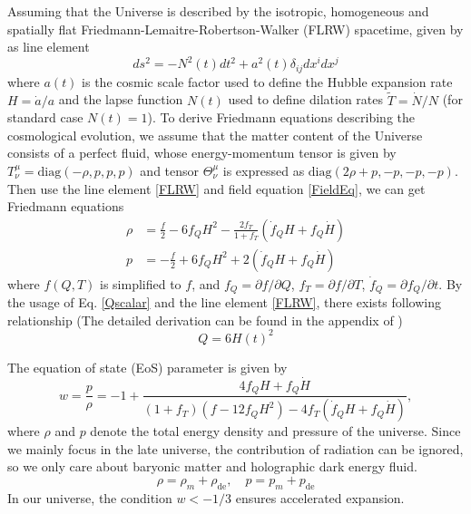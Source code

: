 \documentclass[preprint]{aastex631}
\begin{document}
Assuming that the Universe is described by the isotropic, homogeneous and spatially flat Friedmann-Lemaitre-Robertson-Walker (FLRW) spacetime, given by as line element
\begin{equation}
ds^2=-N^2(t)dt^2+a^2(t)\delta_{ij} dx^i dx^j\label{FLRW}
\end{equation}
where $a(t)$ is the cosmic scale factor
used to define the Hubble expansion rate $H=\dot{a}/a$ and the lapse function $N(t)$ used to define dilation rates $\tilde{T}=\dot{N}/N$ (for standard case $N(t)=1$). To derive Friedmann equations describing the cosmological evolution, we assume that the matter content of the Universe consists of a perfect fluid, whose  energy-momentum tensor is given by $T^{\mu}_\nu=\text{diag}(-\rho,p,p,p)$ and tensor $\Theta^{\mu}_\nu$ is expressed as $\text{diag}(2\rho+p,-p,-p,-p)$. Then use the line element \eqref{FLRW} and field equation \eqref{FieldEq}, we can get Friedmann equations
\begin{align}
\rho &=\frac{f}{2}-6f_Q H^2-\frac{2f_T}{1+f_T}(\dot{f}_QH+f_Q \dot{H}) \\
p &=-\frac{f}{2}+6f_Q H^2+2(\dot{f}_QH+f_Q \dot{H})
\end{align}
where $f(Q,T)$ is simplified to $f$, and $f_Q=\partial f/\partial Q$, $f_T=\partial f/\partial T$, $\dot{f}_Q=\partial f_Q/\partial t$. By the usage of Eq. \eqref{Qscalar} and the line element \eqref{FLRW}, there exists following relationship (The detailed derivation can be found in the appendix of \cite{Xu_2019})
\begin{equation}
    Q=6H(t)^2
\end{equation}

The equation of state (EoS) parameter is given by
\begin{equation}
    w=\frac{p}{\rho}=-1+\frac{4 f_Q H+f_Q \dot{H}}{(1+f_T)(f-12f_QH^2)-4 f_T(\dot{f}_QH+f_Q \dot{H})},
\end{equation}
where $\rho$ and $p$ denote the total energy density and pressure of the universe. Since we mainly focus in the late universe, the contribution of radiation can be ignored, so we only care about baryonic matter and holographic dark energy fluid.
\begin{equation}
    \rho=\rho_m+\rho_\text{de}, \quad p=p_m+p_\text{de}
\end{equation}
In our universe, the condition $w < -1/3$ ensures accelerated expansion. 
\end{document}
